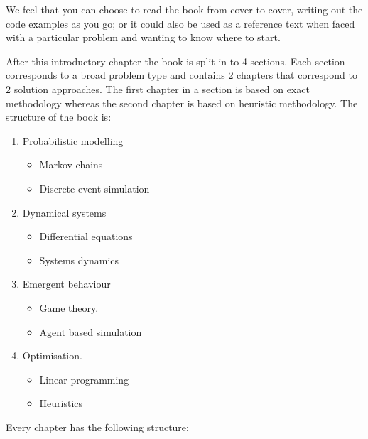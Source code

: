 We feel that you can choose to read the book from cover to cover,
writing out the code examples as you go; or it could also be used as a
reference text when faced with a particular problem and wanting to know
where to start.

After this introductory chapter the book is split in to 4 sections.
Each section corresponds to a broad problem type and contains 2 chapters that
correspond to 2 solution approaches. The first chapter in a section is based on
exact methodology whereas the second chapter is based on heuristic
methodology.
The structure of the book is:

\begin{enumerate}
    \item Probabilistic modelling
        \begin{itemize}
                \item Markov chains
                \item Discrete event simulation
        \end{itemize}
    \item Dynamical systems
        \begin{itemize}
                \item Differential equations
                \item Systems dynamics
        \end{itemize}
    \item Emergent behaviour
        \begin{itemize}
                \item Game theory.
                \item Agent based simulation
        \end{itemize}
    \item Optimisation.
        \begin{itemize}
                \item Linear programming
                \item Heuristics
        \end{itemize}
\end{enumerate}

Every chapter has the following structure:

